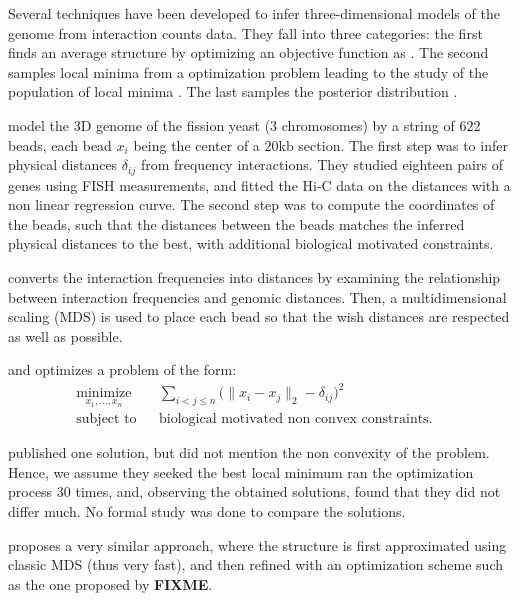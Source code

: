 Several techniques have been developed to infer three-dimensional models of
the genome from interaction counts data. They fall into three categories: the
first finds an average structure by optimizing an objective function as
\citep{tanizawa:mapping, duan:three, ben-elazar:spatial}. The
second samples local minima from a optimization problem leading to the study
of the population of local minima \citep{bau:three-dimensional}. The last
samples the posterior distribution \citep{rousseau:three}.

\citet{tanizawa:mapping} model the 3D genome of the fission yeast (3
chromosomes) by a string of $622$ beads, each bead $x_i$ being the center of a
$20$kb section. The first step was to infer physical distances $\delta_{ij}$
from frequency interactions. They studied eighteen pairs of genes using FISH
measurements, and fitted the Hi-C data on the distances with a non linear
regression curve. The second step was to compute the coordinates of the beads,
such that the distances between the beads matches the inferred physical
distances to the best, with additional biological motivated constraints.

\citet{duan:three} converts the interaction frequencies into distances by
examining the relationship between interaction frequencies and genomic
distances. Then, a multidimensional scaling (MDS) is used to place each bead
so that the wish distances are respected as well as possible.

\citet{tanizawa:mapping} and \citet{duan:three} optimizes a problem of the
form:
\begin{equation*}
\renewcommand{\arraystretch}{2}
\begin{array}{ccll}
\underset{x_1,\ldots, x_n}{\text{minimize}} & &
\underset{i<j\leq n}{\sum} \big(\|x_i - x_j\|_2 - \delta_{ij}\big)^2 &\\
\text{subject to}
& & \text{biological motivated non convex constraints.}
\end{array}
\end{equation*}

\citet{tanizawa:mapping} published one solution, but did not mention the non
convexity of the problem. Hence, we assume they seeked the best local minimum
\citet{duan:three} ran the optimization process 30 times, and, observing the
obtained solutions, found that they did not differ much. No formal study was
done to compare the solutions.

\citet{lesne:3d} proposes a very similar approach, where the structure is
first approximated using classic MDS (thus very fast), and then refined with
an optimization scheme such as the one proposed by \citet{duan:three}
\textbf{FIXME}.

